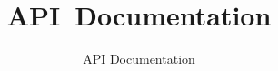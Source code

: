 \documentclass{article}
\begin{document}



\title{API~Documentation}
\author{API Documentation}
\maketitle


\addtolength{\parskip}{-2ex}
\tableofcontents
\addtolength{\parskip}{2ex}








\printindex


\end{document}

